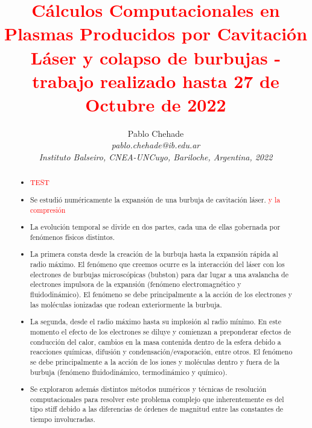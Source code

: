\documentclass[aps,prb,twocolumn,superscriptaddress,floatfix,longbibliography,10pt]{revtex4-2}
\newcounter{para}
\begin{document}
\newcommand{\mytitle}{\textcolor{red}{Cálculos Computacionales en Plasmas Producidos por Cavitación Láser y colapso de burbujas - trabajo realizado hasta 27 de Octubre de 2022}}

\title{\mytitle}

\author{Pablo Chehade \\
    \small \textit{pablo.chehade@ib.edu.ar} \\
    \small \textit{Instituto Balseiro, CNEA-UNCuyo, Bariloche, Argentina, 2022} \\}


\begin{abstract}
  \begin{itemize}
    \item \textcolor{red}{TEST}
    \item Se estudió numéricamente la expansión de una burbuja de cavitación láser. \textcolor{red}{y la compresión}
    \item La evolución temporal se divide en dos partes, cada una de ellas gobernada por fenómenos físicos distintos.
    \item La primera consta desde la creación de la burbuja hasta la expansión rápida al radio máximo. El fenómeno que creemos ocurre es la interacción del láser con los electrones de burbujas microscópicas (bubston) para dar lugar a una avalancha de electrones impulsora de la expansión (fenómeno electromagnético y fluidodinámico). El fenómeno se debe principalmente a la acción de los electrones y las moléculas ionizadas que rodean exteriormente la burbuja.
    \item La segunda, desde el radio máximo hasta su implosión al radio mínimo. En este momento el efecto de los electrones se diluye y comienzan a preponderar efectos de conducción del calor, cambios en la masa contenida dentro de la esfera debido a reacciones químicas, difusión y condensación/evaporación, entre otros. El fenómeno se debe principalmente a la acción de los iones y moléculas dentro y fuera de la burbuja (fenómeno fluidodinámico, termodinámico y químico).
    \item Se exploraron además distintos métodos numéricos y técnicas de resolución computacionales para resolver este problema complejo que inherentemente es del tipo stiff debido a las diferencias de órdenes de magnitud entre las constantes de tiempo involucradas.
  \end{itemize}


\end{abstract}
\end{document}
